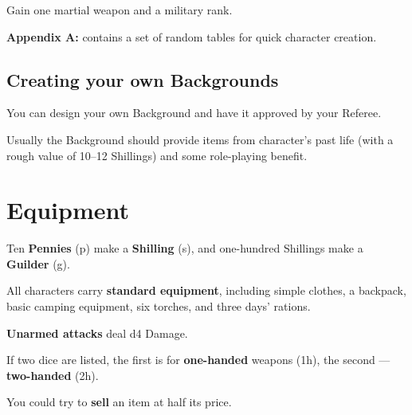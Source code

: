 \documentclass[itdr]{subfiles}
\begin{document}
\vfill
{}
Gain one martial weapon and a military rank.

\vfill
\begin{dbox}
	\textbf{Appendix A: } contains a set of random tables for quick character creation.
\end{dbox}

\vfill
\break

\begin{dbox}
\subsection*{Creating your own Backgrounds}

You can design your own Background and have it approved by your Referee.

Usually the Background should provide items from character's past life (with a rough value of 10--12 Shillings) and some role-playing benefit.
\end{dbox}

\vfill


\vfill
\clearpage


\section{Equipment}

Ten \textbf{Pennies} (p) make a \textbf{Shilling} (s), and one-hundred Shillings make a \textbf{Guilder} (g).

\vfill

All characters carry \textbf{standard equipment}, including simple clothes, a backpack, basic camping equipment, six torches, and three days' rations.

\vfill

\textbf{Unarmed attacks} deal d4 Damage.

\vfill

If two dice are listed, the first is for \textbf{one-handed} weapons (1h), the second --- \textbf{two-handed} (2h).

\vfill

You could try to \textbf{sell} an item at half its price.

\vfill
\end{document}
